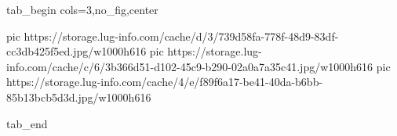  
 
 
 
 


\ifcmt
  tab_begin cols=3,no_fig,center

     pic https://storage.lug-info.com/cache/d/3/739d58fa-778f-48d9-83df-cc3db425f5ed.jpg/w1000h616%
		 pic https://storage.lug-info.com/cache/c/6/3b366d51-d102-45c9-b290-02a0a7a35c41.jpg/w1000h616%
		 pic https://storage.lug-info.com/cache/4/e/f89f6a17-be41-40da-b6bb-85b13bcb5d3d.jpg/w1000h616%

  tab_end
\fi
